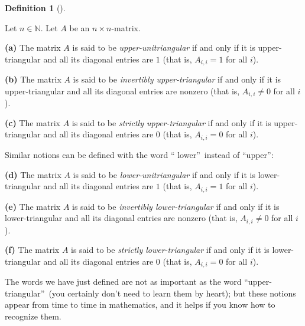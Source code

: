 \documentclass[numbers=enddot,12pt,final,onecolumn,notitlepage]{scrartcl}%
\theoremstyle{definition}
\newtheorem{defi}[theo]{Definition}
\newenvironment{definition}[1][]
{\begin{defi}[#1]\begin{leftbar}}
{\end{leftbar}\end{defi}}
\begin{document}
\begin{definition}
\label{def.triangular.uni-up}Let $n\in\mathbb{N}$. Let $A$ be an $n\times n$-matrix.

\textbf{(a)} The matrix $A$ is said to be \textit{upper-unitriangular} if and
only if it is upper-triangular and all its diagonal entries are $1$ (that is,
$A_{i,i}=1$ for all $i$).

\textbf{(b)} The matrix $A$ is said to be \textit{invertibly upper-triangular}
if and only if it is upper-triangular and all its diagonal entries are nonzero
(that is, $A_{i,i}\neq0$ for all $i$).

\textbf{(c)} The matrix $A$ is said to be \textit{strictly upper-triangular}
if and only if it is upper-triangular and all its diagonal entries are $0$
(that is, $A_{i,i}=0$ for all $i$).

Similar notions can be defined with the word \textquotedblleft
lower\textquotedblright\ instead of \textquotedblleft upper\textquotedblright:

\textbf{(d)} The matrix $A$ is said to be \textit{lower-unitriangular} if and
only if it is lower-triangular and all its diagonal entries are $1$ (that is,
$A_{i,i}=1$ for all $i$).

\textbf{(e)} The matrix $A$ is said to be \textit{invertibly lower-triangular}
if and only if it is lower-triangular and all its diagonal entries are nonzero
(that is, $A_{i,i}\neq0$ for all $i$).

\textbf{(f)} The matrix $A$ is said to be \textit{strictly lower-triangular}
if and only if it is lower-triangular and all its diagonal entries are $0$
(that is, $A_{i,i}=0$ for all $i$).
\end{definition}

The words we have just defined are not as important as the word
\textquotedblleft upper-triangular\textquotedblright\ (you certainly don't
need to learn them by heart); but these notions appear from time to time in
mathematics, and it helps if you know how to recognize them.
\end{document}
